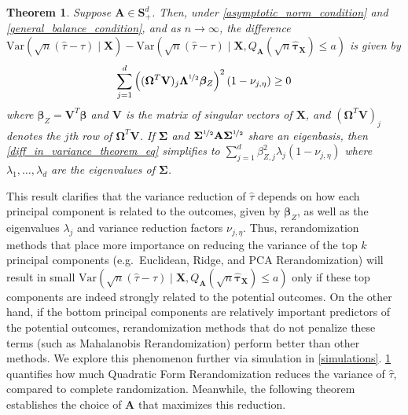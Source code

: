 \documentclass[11pt,twoside]{article}
\newtheorem{theorem}{Theorem}
\theoremstyle{definition}
\theoremstyle{remark}
\begin{document}
\begin{theorem} \label{diff_in_vars}
    Suppose $\mathbf{A} \in \mathbf{S}^{d}_{+}$. Then, under \cref{asymptotic_norm_condition} and \cref{general_balance_condition}, and as $n \to \infty$, the difference $\text{Var}(\sqrt{n}(\widehat{\tau} - \tau) \mid \mathbf{X}) - \text{Var}(\sqrt{n}(\widehat{\tau} - \tau) \mid \mathbf{X}, Q_{\mathbf{A}}(\sqrt{n} \widehat{\bm{\tau}}_{\mathbf{X}}) \leq a)$   is given by
    \begin{align} \label{diff_in_variance_theorem_eq}
         \sum^d_{j=1} \left((\mathbf{\Omega}^T   \mathbf{V})_j \mathbf{\Lambda}^{\nicefrac{1}{2}}  \bm{\beta}_Z \right)^2 (1 - \nu_{j, \eta}) \geq 0
    \end{align}
    where $\bm{\beta}_Z = \mathbf{V}^T \bm{\beta}$ and $\mathbf{V}$ is the matrix of singular vectors of $\mathbf{X}$, and $(\mathbf{\Omega}^T \mathbf{V})_j$ denotes the $j$th row of $\mathbf{\Omega}^T \mathbf{V}$. If $\mathbf{\Sigma}$ and $\mathbf{\Sigma}^{\nicefrac{1}{2}} \mathbf{A} \mathbf{\Sigma}^{\nicefrac{1}{2}}$ share an eigenbasis, then \cref{diff_in_variance_theorem_eq} simplifies to $\sum^d_{j=1} \beta^2_{Z,j} \lambda_j (1 - \nu_{j, \eta})$ where $\lambda_1, \ldots, \lambda_d$ are the eigenvalues of $\mathbf{\Sigma}$. 
\end{theorem}

This result clarifies that the variance reduction of $\widehat{\tau}$ depends on how each principal component is related to the outcomes, given by $\bm{\beta}_Z$, as well as the eigenvalues $\lambda_j$ and variance reduction factors $\nu_{j, \eta}$. Thus, rerandomization methods that place more importance on reducing the variance of the top $k$ principal components (e.g.\ Euclidean, Ridge, and PCA Rerandomization) will result in small $\text{Var}(\sqrt{n}(\widehat{\tau} - \tau) \mid \mathbf{X}, Q_{\mathbf{A}}(\sqrt{n} \widehat{\bm{\tau}}_{\mathbf{X}}) \leq a)$ only if these top components are indeed strongly related to the potential outcomes. On the other hand, if the bottom principal components are relatively important predictors of the potential outcomes, rerandomization methods that do not penalize these terms (such as Mahalanobis Rerandomization) perform better than other methods. We explore this phenomenon further via simulation in \cref{simulations}. 
\cref{diff_in_vars} quantifies how much Quadratic Form Rerandomization reduces the variance of $\widehat{\tau}$, compared to complete randomization. Meanwhile, the following theorem establishes the choice of $\mathbf{A}$ that maximizes this reduction.
\end{document}

